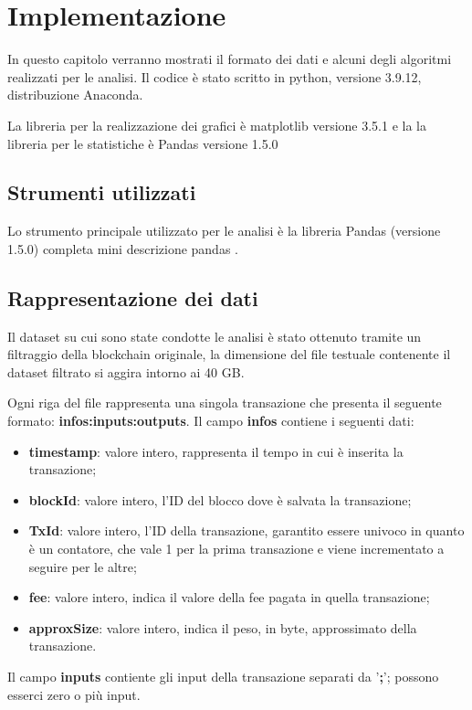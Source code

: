 \chapter{Implementazione}
\captionsetup[table]{name=Struttura}
In questo capitolo verranno mostrati il formato dei dati e alcuni degli algoritmi realizzati per le analisi.
Il codice è stato scritto in python, versione 3.9.12, distribuzione Anaconda.

La libreria per la realizzazione dei grafici è matplotlib versione 3.5.1 e la la libreria per le statistiche è Pandas versione 1.5.0
\section{Strumenti utilizzati}
Lo strumento principale utilizzato per le analisi è la libreria Pandas (versione 1.5.0)
 completa mini descrizione pandas
\cite{pandas}. 
\section{Rappresentazione dei dati}
Il dataset su cui sono state condotte le analisi è stato ottenuto tramite un filtraggio della blockchain originale, la dimensione del file testuale contenente il dataset filtrato si aggira intorno ai 40 GB.

Ogni riga del file rappresenta una singola transazione che presenta il seguente formato:
\textbf{infos:inputs:outputs}.
Il campo \textbf{infos} contiene i seguenti dati:
\begin{itemize}
    \item \textbf{timestamp}: valore intero, rappresenta il tempo in cui è inserita la transazione;
    \item \textbf{blockId}: valore intero, l'ID del blocco dove è salvata la transazione;
    \item \textbf{TxId}: valore intero, l'ID della transazione, garantito essere univoco in quanto è un contatore, che vale 1 per la prima transazione e viene incrementato a seguire per le altre;
    \item \textbf{fee}: valore intero, indica il valore della fee pagata in quella transazione;
    \item \textbf{approxSize}: valore intero, indica il peso, in byte, approssimato della transazione.
\end{itemize}
Il campo \textbf{inputs} contiente gli input della transazione separati da '\textbf{;}'; possono esserci zero o più input.

